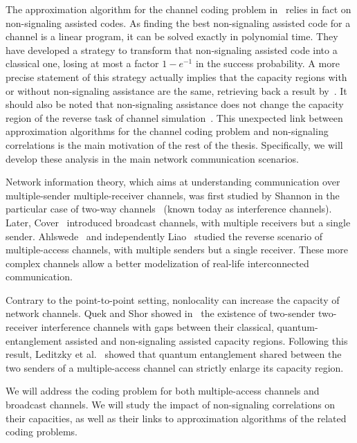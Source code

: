The approximation algorithm for the channel coding problem in~\cite{BF18} relies in fact on non-signaling assisted codes. As finding the best non-signaling assisted code for a channel is a linear program, it can be solved exactly in polynomial time. They have developed a strategy to transform that non-signaling assisted code into a classical one, losing at most a factor $1-e^{-1}$ in the success probability. A more precise statement of this strategy actually implies that the capacity regions with or without non-signaling assistance are the same, retrieving back a result by~\cite{Matthews12}. It should also be noted that non-signaling assistance does not change the capacity region of the reverse task of channel simulation~\cite{CRBT22}. This unexpected link between approximation algorithms for the channel coding problem and non-signaling correlations is the main motivation of the rest of the thesis. Specifically, we will develop these analysis in the main network communication scenarios.

Network information theory, which aims at understanding communication over multiple-sender multiple-receiver channels, was first studied by Shannon in the particular case of two-way channels~\cite{Shannon61} (known today as interference channels). Later, Cover~\cite{Cover72} introduced broadcast channels, with multiple receivers but a single sender. Ahlswede~\cite{Ahlswede73} and independently Liao~\cite{Liao73} studied the reverse scenario of multiple-access channels, with multiple senders but a single receiver. These more complex channels allow a better modelization of real-life interconnected communication.

Contrary to the point-to-point setting, nonlocality can increase the capacity of network channels. Quek and Shor showed in~\cite{QS17} the existence of two-sender two-receiver interference channels with gaps between their classical, quantum-entanglement assisted and non-signaling assisted capacity regions. Following this result, Leditzky et al.~\cite{LALS20,SLSS22} showed that quantum entanglement shared between the two senders of a multiple-access channel can strictly enlarge its capacity region.

We will address the coding problem for both multiple-access channels and broadcast channels. We will study the impact of non-signaling correlations on their capacities, as well as their links to approximation algorithms of the related coding problems.


